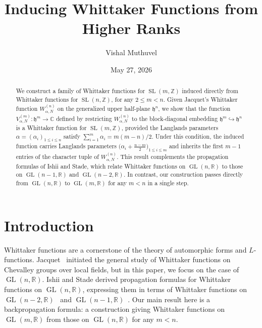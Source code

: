 \documentclass[12pt, reqno, oneside]{amsart}
\title{Inducing Whittaker Functions from Higher Ranks}
\author{Vishal Muthuvel}
\date{May 27, 2026}
\theoremstyle{definition}
\numberwithin{equation}{section}
\newcommand{\R}{\mathbb{R}}
\DeclareMathOperator{\GL}{GL}
\DeclareMathOperator{\SL}{SL}
\begin{document}

\begin{abstract}
We construct a family of Whittaker functions for $\SL(m,\mathbb{Z})$ induced directly from Whittaker functions for $\SL(n,\mathbb{Z})$, for any $2\leq m<n$. Given Jacquet's Whittaker function $W_{\alpha,N}^{(n)}$ on the generalized upper half-plane $\mathfrak{h}^n$, we show that the function $V_{\alpha,N}^{(m)}:\mathfrak{h}^m\to\mathbb{C}$ defined by restricting $W_{\alpha,N}^{(n)}$ to the block-diagonal embedding $\mathfrak{h}^m\hookrightarrow\mathfrak{h}^n$ is a Whittaker function for $\SL(m,\mathbb{Z})$, provided the Langlands parameters $\alpha=(\alpha_i)_{1\leq i\leq n}$ satisfy $\sum_{i=1}^m\alpha_i = m(m-n)/2$. Under this condition, the induced function carries Langlands parameters $\bigl(\alpha_i+\frac{n-m}{2}\bigr)_{1\leq i\leq m}$ and inherits the first $m-1$ entries of the character tuple of $W_{\alpha,N}^{(n)}$. This result complements the propagation formulas of Ishii and Stade, which relate Whittaker functions on $\GL(n,\mathbb{R})$ to those on $\GL(n-1,\mathbb{R})$ and $\GL(n-2,\mathbb{R})$. In contrast, our construction passes directly from $\GL(n,\mathbb{R})$ to $\GL(m,\mathbb{R})$ for any $m < n$ in a single step.
\end{abstract}

\maketitle

\tableofcontents

\section{Introduction}

Whittaker functions are a cornerstone of the theory of automorphic forms
and $L$-functions. Jacquet~\cite{Jac67} initiated the general study of
Whittaker functions on Chevalley groups over local fields, but in this
paper, we focus on the case of $\GL(n,\R)$. Ishii and Stade derived
propagation formulas for Whittaker functions on $\GL(n,\R)$, expressing
them in terms of Whittaker functions on $\GL(n-2,\R)$~\cite{Ish05} and
$\GL(n-1,\R)$~\cite{IS07}. Our
main result here is a backpropagation formula: a construction giving
Whittaker functions on $\GL(m,\R)$ from those on $\GL(n,\R)$ for any
$m < n$.
\end{document}
